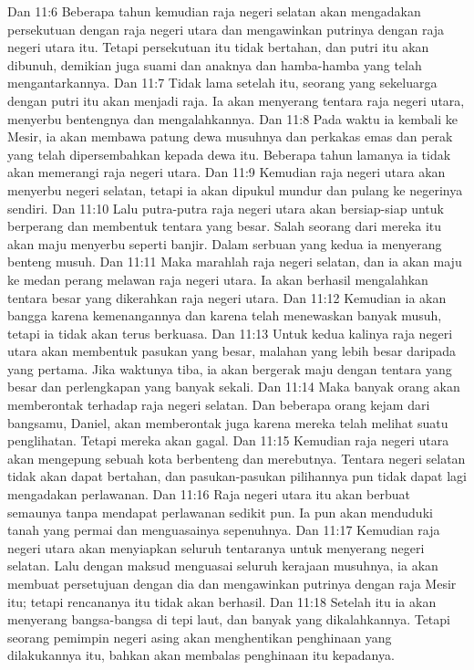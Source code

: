 Dan 11:6  Beberapa tahun kemudian raja negeri selatan akan mengadakan persekutuan dengan raja negeri utara dan mengawinkan putrinya dengan raja negeri utara itu. Tetapi persekutuan itu tidak bertahan, dan putri itu akan dibunuh, demikian juga suami dan anaknya dan hamba-hamba yang telah mengantarkannya.
Dan 11:7  Tidak lama setelah itu, seorang yang sekeluarga dengan putri itu akan menjadi raja. Ia akan menyerang tentara raja negeri utara, menyerbu bentengnya dan mengalahkannya.
Dan 11:8  Pada waktu ia kembali ke Mesir, ia akan membawa patung dewa musuhnya dan perkakas emas dan perak yang telah dipersembahkan kepada dewa itu. Beberapa tahun lamanya ia tidak akan memerangi raja negeri utara.
Dan 11:9  Kemudian raja negeri utara akan menyerbu negeri selatan, tetapi ia akan dipukul mundur dan pulang ke negerinya sendiri.
Dan 11:10  Lalu putra-putra raja negeri utara akan bersiap-siap untuk berperang dan membentuk tentara yang besar. Salah seorang dari mereka itu akan maju menyerbu seperti banjir. Dalam serbuan yang kedua ia menyerang benteng musuh.
Dan 11:11  Maka marahlah raja negeri selatan, dan ia akan maju ke medan perang melawan raja negeri utara. Ia akan berhasil mengalahkan tentara besar yang dikerahkan raja negeri utara.
Dan 11:12  Kemudian ia akan bangga karena kemenangannya dan karena telah menewaskan banyak musuh, tetapi ia tidak akan terus berkuasa.
Dan 11:13  Untuk kedua kalinya raja negeri utara akan membentuk pasukan yang besar, malahan yang lebih besar daripada yang pertama. Jika waktunya tiba, ia akan bergerak maju dengan tentara yang besar dan perlengkapan yang banyak sekali.
Dan 11:14  Maka banyak orang akan memberontak terhadap raja negeri selatan. Dan beberapa orang kejam dari bangsamu, Daniel, akan memberontak juga karena mereka telah melihat suatu penglihatan. Tetapi mereka akan gagal.
Dan 11:15  Kemudian raja negeri utara akan mengepung sebuah kota berbenteng dan merebutnya. Tentara negeri selatan tidak akan dapat bertahan, dan pasukan-pasukan pilihannya pun tidak dapat lagi mengadakan perlawanan.
Dan 11:16  Raja negeri utara itu akan berbuat semaunya tanpa mendapat perlawanan sedikit pun. Ia pun akan menduduki tanah yang permai dan menguasainya sepenuhnya.
Dan 11:17  Kemudian raja negeri utara akan menyiapkan seluruh tentaranya untuk menyerang negeri selatan. Lalu dengan maksud menguasai seluruh kerajaan musuhnya, ia akan membuat persetujuan dengan dia dan mengawinkan putrinya dengan raja Mesir itu; tetapi rencananya itu tidak akan berhasil.
Dan 11:18  Setelah itu ia akan menyerang bangsa-bangsa di tepi laut, dan banyak yang dikalahkannya. Tetapi seorang pemimpin negeri asing akan menghentikan penghinaan yang dilakukannya itu, bahkan akan membalas penghinaan itu kepadanya.
